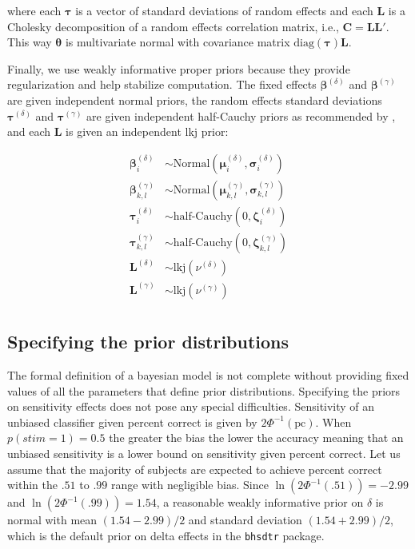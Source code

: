 \documentclass[oneside,a4paper]{article}
\begin{document}
\noindent where each $\bm{\tau}$ is a vector of standard deviations of
random effects and each $\bm{L}$ is a Cholesky decomposition of a
random effects correlation matrix, i.e., $\bm{C} = \bm{L}
\bm{L}'$. This way $\bm{\theta}$ is multivariate normal with
covariance matrix $\text{diag}(\bm{\tau}) \bm{L}$.

Finally, we use weakly informative proper priors because they provide
regularization and help stabilize computation. The fixed effects
$\bm{\beta}^{(\delta)}$ and $\bm{\beta}^{(\gamma)}$ are given
independent normal priors, the random effects standard deviations
$\bm{\tau}^{(\delta)}$ and $\bm{\tau}^{(\gamma)}$ are given
independent half-Cauchy priors as recommended by
, and each $\bm{L}$ is given an independent lkj
prior:

\begin{align*}
  \bm{\beta}^{(\delta)}_i &\sim \text{Normal}(\bm{\mu}^{(\delta)}_i, \bm{\sigma}^{(\delta)}_i) \\
  \bm{\beta}^{(\gamma)}_{k,l} &\sim \text{Normal}(\bm{\mu}^{(\gamma)}_{k,l}, \bm{\sigma}^{(\gamma)}_{k,l}) \\
  \bm{\tau}^{(\delta)}_i &\sim \text{half-Cauchy}(0, \bm{\zeta}^{(\delta)}_i) \\
  \bm{\tau}^{(\gamma)}_{k,l} &\sim \text{half-Cauchy}(0, \bm{\zeta}^{(\gamma)}_{k,l}) \\
  \bm{L}^{(\delta)} &\sim \text{lkj}(\nu^{(\delta)}) \\
  \bm{L}^{(\gamma)} &\sim \text{lkj}(\nu^{(\gamma)}) \\
\end{align*}

\subsection{Specifying the prior distributions}

The formal definition of a bayesian model is not complete without
providing fixed values of all the parameters that define prior
distributions. Specifying the priors on sensitivity effects does not
pose any special difficulties. Sensitivity of an unbiased classifier
given percent correct is given by $2 \Phi^{-1}(\text{pc})$. When
$p(stim = 1) = 0.5$ the greater the bias the lower the accuracy
meaning that an unbiased sensitivity is a lower bound on sensitivity
given percent correct. Let us assume that the majority of subjects are
expected to achieve
percent correct within the $.51$ to $.99$ range with negligible
bias. Since $\ln(2\Phi^{-1}(.51)) = -2.99$ and
$\ln(2 \Phi^{-1}(.99)) = 1.54$, a reasonable weakly informative prior
on $\delta$ is normal with mean $(1.54 - 2.99) / 2$ and standard
deviation $(1.54 + 2.99) / 2$, which is the default prior on delta
effects in the \texttt{bhsdtr} package.
\end{document}
